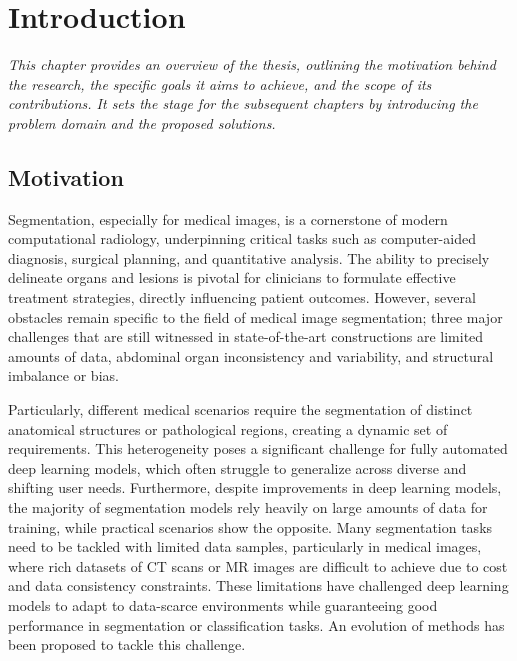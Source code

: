 \chapter{Introduction}
\label{ch:intro}

\textit{This chapter provides an overview of the thesis, outlining the motivation behind the research, the specific goals it aims to achieve, and the scope of its contributions. It sets the stage for the subsequent chapters by introducing the problem domain and the proposed solutions.}

\section{Motivation}
\label{sec:intro-motiv}

Segmentation, especially for medical images, is a cornerstone of modern computational radiology, underpinning critical tasks such as computer-aided diagnosis, surgical planning, and quantitative analysis. The ability to precisely delineate organs and lesions is pivotal for clinicians to formulate effective treatment strategies, directly influencing patient outcomes. However, several obstacles remain specific to the field of medical image segmentation; three major challenges that are still witnessed in state-of-the-art constructions are limited amounts of data, abdominal organ inconsistency and variability, and structural imbalance or bias.

Particularly, different medical scenarios require the segmentation of distinct anatomical structures or pathological regions, creating a dynamic set of requirements. This heterogeneity poses a significant challenge for fully automated deep learning models, which often struggle to generalize across diverse and shifting user needs. Furthermore, despite improvements in deep learning models, the majority of segmentation models rely heavily on large amounts of data for training, while practical scenarios show the opposite. Many segmentation tasks need to be tackled with limited data samples, particularly in medical images, where rich datasets of CT scans or MR images are difficult to achieve due to cost and data consistency constraints. These limitations have challenged deep learning models to adapt to data-scarce environments while guaranteeing good performance in segmentation or classification tasks. An evolution of methods has been proposed to tackle this challenge.

